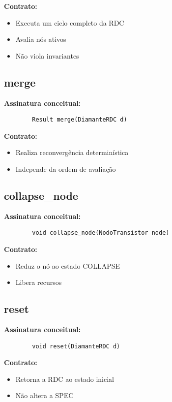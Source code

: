 \documentclass[12pt,a4paper]{article}
\begin{document}
	\textbf{Contrato:}
	\begin{itemize}
		\item Executa um ciclo completo da RDC
		\item Avalia nós ativos
		\item Não viola invariantes
	\end{itemize}
	
	\subsection{merge}
	
	\textbf{Assinatura conceitual:}
	
	\begin{verbatim}
		Result merge(DiamanteRDC d)
	\end{verbatim}
	
	\textbf{Contrato:}
	\begin{itemize}
		\item Realiza reconvergência determinística
		\item Independe da ordem de avaliação
	\end{itemize}
	
	\subsection{collapse\_node}
	
	\textbf{Assinatura conceitual:}
	
	\begin{verbatim}
		void collapse_node(NodoTransistor node)
	\end{verbatim}
	
	\textbf{Contrato:}
	\begin{itemize}
		\item Reduz o nó ao estado COLLAPSE
		\item Libera recursos
	\end{itemize}
	
	\subsection{reset}
	
	\textbf{Assinatura conceitual:}
	
	\begin{verbatim}
		void reset(DiamanteRDC d)
	\end{verbatim}
	
	\textbf{Contrato:}
	\begin{itemize}
		\item Retorna a RDC ao estado inicial
		\item Não altera a SPEC
	\end{itemize}
	
\end{document}
